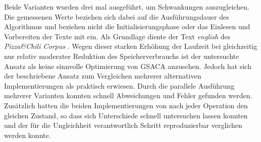 Beide Varianten wurden drei mal ausgeführt, um Schwankungen auszugleichen.
Die gemessenen Werte beziehen sich dabei auf die Ausführungsdauer des Algorithmus und beziehen nicht die Initialisierungsphase oder das Einlesen und Vorbereiten der Texte mit ein.
Als Grundlage diente der Text \textit{english} des \textit{Pizza\&Chili Corpus} \cite{testdaten:pizzachilli2007}.
Wegen dieser starken Erhöhung der Laufzeit bei gleich\-zeitig nur relativ moderater Reduktion des Speicherverbrauchs ist der untersuchte Ansatz als keine sinnvolle Optimierung von GSACA anzusehen.
Jedoch hat sich der beschriebene Ansatz zum Vergleichen mehrerer alternativen Implementierungen als praktisch erwiesen.
Durch die parallele Ausführung mehrerer Varianten konnten schnell Abweichungen und Fehler gefunden werden.
Zusätz\-lich hatten die beiden Implementierungen von \gsize nach jeder Operation den gleichen Zustand, so dass sich Unterschiede schnell untersuchen lassen konnten und der für die Ungleichheit verantwortlich Schritt reproduzierbar verglichen werden konnte. \par


